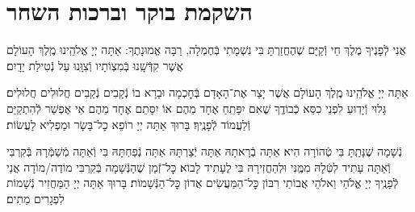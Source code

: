 \documentclass[twoside, openany, parskip=half, 11pt]{book}
\begin{document}
\renewcommand{\contentsname}{}
\tableofcontents

\clearpage



\setcounter{page}{1}

\vspace*{\fill}

\thispagestyle{empty}
\begin{Large}
\begin{center}
\end{center}
\end{Large}


\vspace*{\fill}


\centerlast

\chapter[שחרית לחול]{ השקמת בוקר וברכות השחר }

\renewcommand{\thefootnote}{\roman{footnote}} %
\setlength{\parskip}{0.75em}
אֲנִי לְֿפָנֶיךָ מֶלֶךְ חַי וְֿקַיָּם שֶׁהֶחֱזַרְתָּ בִּי נִשְׁמָתִי בְּֿחֶמְלָה, רַבָּה אֱמוּנָתֶךָ:
אַתָּה יְיָ אֱלֹהֵֽינוּ מֶֽלֶךְ הָעוֹלָם אֲשֶׁר קִדְּֿשָֽׁנוּ בְּֿמִצְוֹתָיו וְֿצִוָּֽנוּ עַל נְֿטִילַת יָדָֽיִם׃

אַתָּה יְיָ אֱלֹהֵֽינוּ מֶֽלֶךְ הָעוֹלָם אֲשֶׁר יָצַר אֶת־הָאָדָם בְּֿחׇכְמָה וּבָרָא בוֹ נְֿקָבִים נְֿקָבִים חֲלוּלִים חֲלוּלִים׃ גָּלוּי וְֿיָדֽוּעַ לִפְנֵי כִסֵּא כְֿבוֹדֶֽךָ שֶׁאִם יִפָּתֵֽחַ אֶחָד מֵהֶם אוֹ יִסָּתֵם אֶחָד מֵהֶם אִי אֶפְשַׁר לְֿהִתְקַיֵּם וְֿלַעֲמוֹד לְֿפָנֶֽיךָ׃ בָּרוּךְ אַתָּה יְיָ רוֹפֵא כׇל־בָּשָׂר וּמַפְלִיא לַעֲשׂוֹת׃


נְֿשָׁמָה שֶׁנָּתַֽתָּ בִּי טְֿהוֹרָה הִיא׃ אַתָּה בְֿרָאתָהּ אַתָּה יְֿצַרְתָּהּ אַתָּה נְֿפַחְתָּהּ בִּי וְֿאַתָּה מְֿשַׁמְּֿרָהּ בְּֿקִרְבִּי וְֿאַתָּה עָתִיד לִטְּֿלָהּ מִמֶּֽנִּי וּלְהַחֲזִירָהּ בִּי לֶעָתִיד לָבוֹא׃ כׇּל־זְֿמַן שֶׁהַנְּֿשָׁמָה בְּֿקִרְבִּי מוֹדֶה/מוֹדָה אֲנִי לְֿפָנֶֽיךָ יְיָ אֱלֹהַי וֵאלֹהֵי אֲבוֹתַי רִבּוֹן כׇּל־הַמַּעֲשִׂים אֲדוֹן כׇּל־הַנְּֿשָׁמוֹת׃ בָּרוּךְ אַתָּה יְיָ הַמַּחֲזִיר נְֿשָׁמוֹת לִפְגָרִים מֵתִים׃
\end{document}
